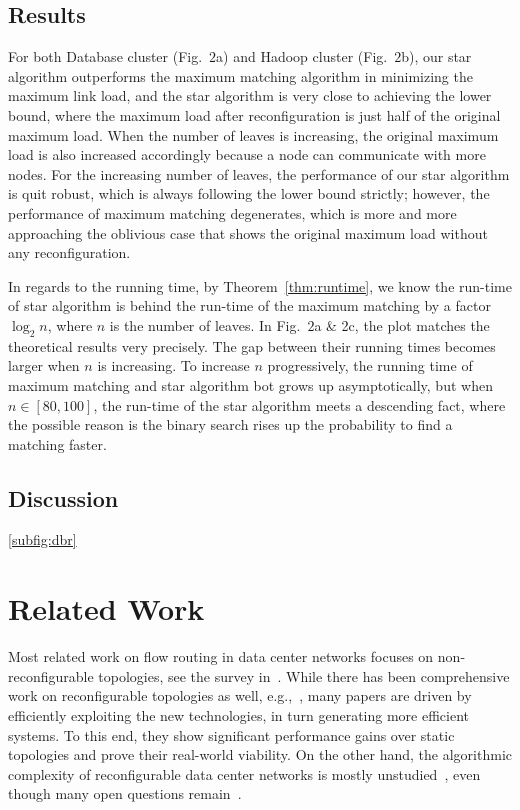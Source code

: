 \documentclass[sigconf]{acmart}
\begin{document}
\subsection{Results}\label{subsec:results}
For both Database cluster (Fig.~$2$a) and Hadoop cluster (Fig.~$2$b), our star algorithm outperforms the maximum matching algorithm in minimizing the maximum link load, and the star algorithm is very close to achieving the lower bound, where the maximum load after reconfiguration is just half of the original maximum load.  When the number of leaves is increasing, the original maximum load is also increased accordingly because a node can communicate with more nodes.  For the increasing number of leaves,  the performance of our star algorithm is quit robust, which is always following the lower bound strictly; however, the performance of maximum matching degenerates, which is more and more  approaching the oblivious case that shows the original maximum load without any reconfiguration.

In regards to the running time, by Theorem~\ref{thm:runtime}, we know the run-time of star algorithm is behind the run-time of the maximum matching by a factor $\log_{2}{n}$, where $n$ is the number of leaves. In  Fig.~$2$a \& 2c, the plot matches the theoretical results very precisely. The gap between their running times  becomes  larger when $n$ is increasing. To increase $n$ progressively, the running time of maximum matching and  star algorithm bot grows up asymptotically, but when $n\in [80,100]$, the run-time of the star algorithm meets a descending fact, where the possible reason is the binary search rises up the probability to find a matching faster.

\subsection{Discussion}\label{subsec:discussion}

\ref{subfig:dbr} 

\section{Related Work}\label{sec:related}
Most related work on flow routing in data center networks focuses on non-reconfigurable topologies, see the survey in~\cite{DBLP:journals/comsur/Noormohammadpour18}.
%
While there has been comprehensive work on reconfigurable topologies as well, e.g.,~\cite{helios,cthrough,reactor,rotornet,projector,solstice,eclipse-journal,DBLP:conf/sigcomm/XiaSD0HN17,opera,augmenting,DBLP:conf/hotnets/WangAKKNPGM09,blast, mordia,chen2014osa}, many papers are driven by efficiently exploiting the new technologies, in turn generating more efficient systems.
%
To this end, they show significant performance gains over static topologies and prove their real-world viability.
%
On the other hand, the algorithmic complexity of reconfigurable data center networks is mostly unstudied~\cite{DBLP:journals/sigact/FoersterS19}, even though many open questions remain~\cite{DBLP:journals/ccr/AvinS18}.
%
%
\end{document}
